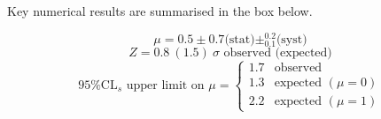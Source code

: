 Key numerical results are summarised in the box below.
\vspace{5mm}
\begin{mdframed}[backgroundcolor=aliceblue]
\vspace{2mm}
\begin{equation*}
\mu = 0.5 \pm 0.7 \text{(stat)} \pm^{0.2}_{0.1} \text{(syst)}
\end{equation*}
\begin{equation*}
Z = 0.8~(1.5)~\sigma \text{ observed (expected)}
\end{equation*}
\begin{equation*}
\text{95\% CL$_s$ upper limit on $\mu$} =
    \begin{cases}
     1.7 & \text{observed } \\
     1.3 & \text{expected } (\mu = 0) \\
     2.2 & \text{expected } (\mu = 1)
    \end{cases}
\end{equation*}
\vspace{2mm}
\end{mdframed}


